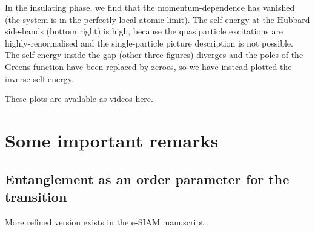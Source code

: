 \documentclass{report}
\numberwithin{equation}{section}
\begin{document}
{In the insulating phase, we find that the momentum-dependence has vanished (the system is in the perfectly local atomic limit). The self-energy at the Hubbard side-bands (bottom right) is high, because the quasiparticle excitations are highly-renormalised and the single-particle picture description is not possible. The self-energy inside the gap (other three figures) diverges and the poles of the Greens function have been replaced by zeroes, so we have instead plotted the inverse self-energy.

These plots are available as videos \href{https://abhirup-m.github.io/misc-sigma/}{\underline{here}}.
}

\section{Some important remarks}
\subsection{Entanglement as an order parameter for the transition}
More refined version exists in the e-SIAM manuscript.
\end{document}
